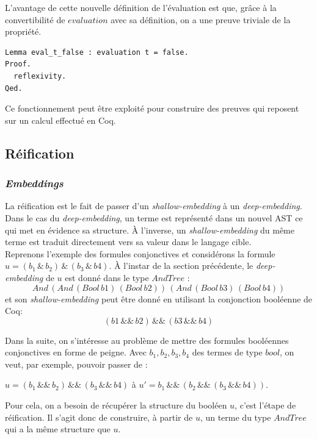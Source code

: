 \documentclass[11pt]{article}
\begin{document}
L'avantage de cette nouvelle définition de l'évaluation est que, grâce à la convertibilité de $evaluation$ avec sa définition, on a une preuve triviale de la propriété.
\begin{lstlisting}[frame=single]
Lemma eval_t_false : evaluation t = false.
Proof.
  reflexivity.
Qed.
\end{lstlisting}

Ce fonctionnement peut être exploité pour construire des preuves qui reposent sur un calcul effectué en Coq. 


\subsection{Réification}

\subsubsection{\textit{Embeddings}}

La réification est le fait de passer d'un \textit{shallow-embedding} à un \textit{deep-embedding}. \\

Dans le cas du \textit{deep-embedding}, un terme est représenté dans un nouvel AST ce qui met en évidence sa structure. À l'inverse, un \textit{shallow-embedding} du même terme est traduit directement vers sa valeur dans le langage cible. \\

Reprenons l'exemple des formules conjonctives et considérons la formule $ u = (b_1 \,\&\, b_2) \,\&\, (b_3 \,\&\, b4)$. À l'instar de la section précédente, le \textit{deep-embedding} de $u$ est donné dans le type $AndTree$ :
\[And\,(And\,(Bool\,b1)\,(Bool\,b2))\,(And\,(Bool\,b3)\,(Bool\,b4))\] 
et son \textit{shallow-embedding} peut être donné en utilisant la conjonction booléenne de Coq: 
\[(b1\,\&\&\,b2)\,\&\&\,(b3\,\&\&\,b4) \]

Dans la suite, on s'intéresse au problème de mettre des formules booléennes conjonctives en forme de peigne. Avec $b_1, b_2, b_3, b_4$ des termes de type $bool$, on veut, par exemple, pouvoir passer de : 
\begin{center}
$ u = (b_1 \,\&\&\, b_2) \,\&\&\, (b_3 \,\&\&\, b4)$ \hspace{1cm} à   \hspace{1cm}  $u' = b_1 \,\&\&\, (b_2 \,\&\&\, (b_3 \,\&\&\, b4)). $
\end{center}

Pour cela, on a besoin de récupérer la structure du booléen $u$, c'est l'étape de réification. Il s'agit donc de construire, à partir de $u$, un terme du type $AndTree$ qui a la même structure que $u$.
\end{document}
